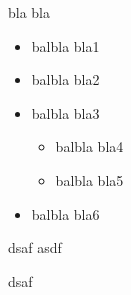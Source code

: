 bla bla 

\begin{itemize}
	\item balbla bla1
	\item balbla bla2
	\item balbla bla3
	\begin{itemize}
		\item balbla bla4
		\item balbla bla5
	\end{itemize}
	\item balbla bla6
\end{itemize}
dsaf
asdf

dsaf